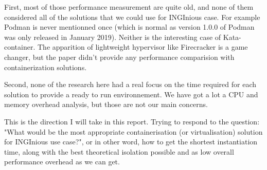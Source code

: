 First, most of those performance measurement are quite old, and none of them considered all of the solutions that we could use for INGInious case.  For example Podman is never mentionned once (which is normal as version 1.0.0 of Podman was only released in January 2019).  Neither is the interesting case of Kata-container.  The apparition of lightweight hypervisor like Firecracker is a game changer, but the paper didn't provide any performance comparision with containerization solutions.

Second, none of the research here had a real focus on the time required for each solution to provide a ready to run environnement.  We have got a lot a CPU and memory overhead analysis, but those are not our main concerns.

This is the direction I will take in this report.  Trying to respond to the question: "What would be the most appropriate containerisation (or virtualisation) solution for INGInious use case?", or in other word, how to get the shortest instantiation time, along with the best theoretical isolation possible and as low overall performance overhead as we can get.
